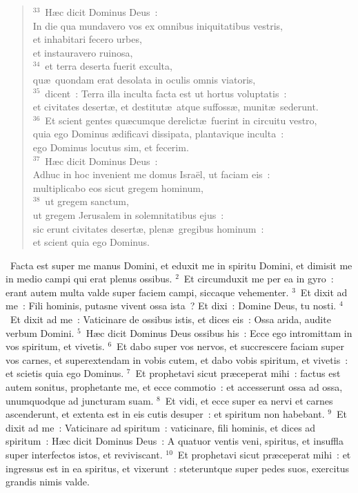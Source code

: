 \begin{flushleft}\begin{verse}${}^{33}$~H\ae c dicit Dominus Deus~:\\ In die qua mundavero vos ex omnibus iniquitatibus vestris,\\ et inhabitari fecero urbes,\\ et instauravero ruinosa,\\
${}^{34}$~et terra deserta fuerit exculta,\\ qu\ae\ quondam erat desolata in oculis omnis viatoris,\\
${}^{35}$~dicent~: Terra illa inculta facta est ut hortus voluptatis~:\\ et civitates desert\ae , et destitut\ae\ atque suffoss\ae , munit\ae\ sederunt.\\
${}^{36}$~Et scient gentes qu\ae cumque derelict\ae\ fuerint in circuitu vestro,\\ quia ego Dominus \ae dificavi dissipata, plantavique inculta~:\\ ego Dominus locutus sim, et fecerim.\\
${}^{37}$~H\ae c dicit Dominus Deus~:\\ Adhuc in hoc invenient me domus Isra\"el, ut faciam eis~:\\ multiplicabo eos sicut gregem hominum,\\
${}^{38}$~ut gregem sanctum,\\ ut gregem Jerusalem in solemnitatibus ejus~:\\ sic erunt civitates desert\ae , plen\ae\ gregibus hominum~:\\ et scient quia ego Dominus.\end{verse}\end{flushleft}


~Facta est super me manus Domini, et eduxit me in spiritu Domini, et dimisit me in medio campi qui erat plenus ossibus.
${}^{2}$~Et circumduxit me per ea in gyro~: erant autem multa valde super faciem campi, siccaque vehementer.
${}^{3}$~Et dixit ad me~: Fili hominis, putasne vivent ossa ista~? Et dixi~: Domine Deus, tu nosti.
${}^{4}$~Et dixit ad me~: Vaticinare de ossibus istis, et dices eis~: Ossa arida, audite verbum Domini.
${}^{5}$~H\ae c dicit Dominus Deus ossibus his~: Ecce ego intromittam in vos spiritum, et vivetis.
${}^{6}$~Et dabo super vos nervos, et succrescere faciam super vos carnes, et superextendam in vobis cutem, et dabo vobis spiritum, et vivetis~: et scietis quia ego Dominus.
${}^{7}$~Et prophetavi sicut pr\ae ceperat mihi~: factus est autem sonitus, prophetante me, et ecce commotio~: et accesserunt ossa ad ossa, unumquodque ad juncturam suam.
${}^{8}$~Et vidi, et ecce super ea nervi et carnes ascenderunt, et extenta est in eis cutis desuper~: et spiritum non habebant.
${}^{9}$~Et dixit ad me~: Vaticinare ad spiritum~: vaticinare, fili hominis, et dices ad spiritum~: H\ae c dicit Dominus Deus~: A quatuor ventis veni, spiritus, et insuffla super interfectos istos, et reviviscant.
${}^{10}$~Et prophetavi sicut pr\ae ceperat mihi~: et ingressus est in ea spiritus, et vixerunt~: steteruntque super pedes suos, exercitus grandis nimis valde.


